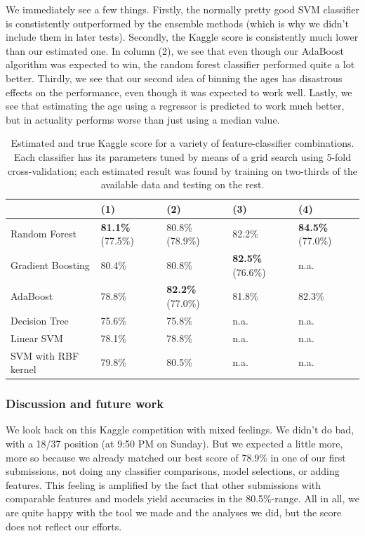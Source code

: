 \documentclass[runningheads,a4paper]{llncs}
\begin{document}
We immediately see a few things.  Firstly, the normally pretty good SVM classifier is constistently outperformed by the ensemble methods (which is why we didn't include them in later tests).   Secondly, the Kaggle score is consistently much lower than our estimated one. In column (2), we see that even though our AdaBoost algorithm was expected to win, the random forest classifier performed quite a lot better.  Thirdly, we see that our second idea of binning the ages has disastrous effects on the performance, even though it was expected to work well.  Lastly, we see that estimating the age using a regressor is predicted to work much better, but in actuality performs worse than just using a median value.

\begin{table}[h]
\centering
\begin{tabular}{lllll}
                      & (1)                       & (2)                       & (3)                      & (4) \\\toprule
Random Forest         & \textbf{81.1\%} (77.5\%)  & 80.8\% (78.9\%)           & 82.2\%                   & \textbf{84.5\%} (77.0\%) \\
Gradient Boosting     & 80.4\%                    & 80.8\%                    & \textbf{82.5\%} (76.6\%) & n.a. \\
AdaBoost              & 78.8\%                    & \textbf{82.2\%} (77.0\%)  & 81.8\% & 82.3\% \\
Decision Tree         & 75.6\%                    & 75.8\%                    & n.a. & n.a.\\
Linear SVM            & 78.1\%                    & 78.8\%                    & n.a. & n.a.\\
SVM with RBF kernel   & 79.8\%                    & 80.5\%                    & n.a. & n.a.\\\bottomrule
\end{tabular}
\vspace{2em}
\caption{Estimated and true Kaggle score for a variety of feature-classifier combinations.  Each classifier has its parameters tuned by means of a grid search using 5-fold cross-validation; each estimated result was found by training on two-thirds of the available data and testing on the rest.}
\label{tbl:results}
\end{table}

\subsubsection{Discussion and future work}
We look back on this Kaggle competition with mixed feelings.  We didn't do bad, with a 18/37 position (at 9:50 PM on Sunday).  But we expected a little more, more so because we already matched our best score of 78.9\% in one of our first submissions, not doing any classifier comparisons, model selections, or adding features.  This feeling is amplified by the fact that other submissions with comparable features and models yield accuracies in the 80.5\%-range.  All in all, we are quite happy with the tool we made and the analyses we did, but the score does not reflect our efforts.
\end{document}
